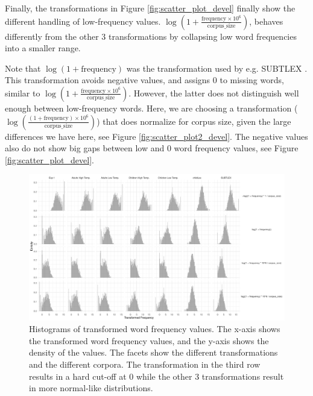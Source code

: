 \documentclass[doc, a4paper, anonymous]{apa7}
\begin{document}
Finally, the transformations in Figure \ref{fig:scatter_plot_devel} finally show the different handling of low-frequency values. $\log \left( 1 + \frac{\text{frequency} \times 10^6}{\text{corpus\_size}} \right)$, behaves differently from the other 3 transformations by collapsing low word frequencies into a smaller range. 

Note that $\log \left( 1 + \text{frequency} \right)$ was the transformation used by e.g. SUBTLEX \citep{brysbaert_word_2011}. This transformation avoids negative values, and assigns 0 to missing words, similar to $\log \left( 1 + \frac{\text{frequency} \times 10^6}{\text{corpus\_size}} \right)$. However, the latter does not distinguish well enough between low-frequency words. Here, we are choosing a transformation ($\log\left(\frac{(1 + \text{frequency}) \times 10^6}{\text{corpus\_size}}\right)$) that does normalize for corpus size, given the large differences we have here, see Figure \ref{fig:scatter_plot2_devel}. The negative values also do not show big gaps between low and 0 word frequency values, see Figure \ref{fig:scatter_plot_devel}. 

\begin{figure}[!htbp]
    \includegraphics[width = 0.8\paperwidth]{figures/histogram_plot_devel.pdf}
    \caption{ Histograms of transformed word frequency values. The x-axis shows the transformed word frequency values, and the y-axis shows the density of the values. The facets show the different transformations and the different corpora. The transformation in the third row results in a hard cut-off at 0 while the other 3 transformations result in more normal-like distributions. }
    \label{fig:histogram_plot_devel}
\end{figure}

\clearpage
\end{document}
